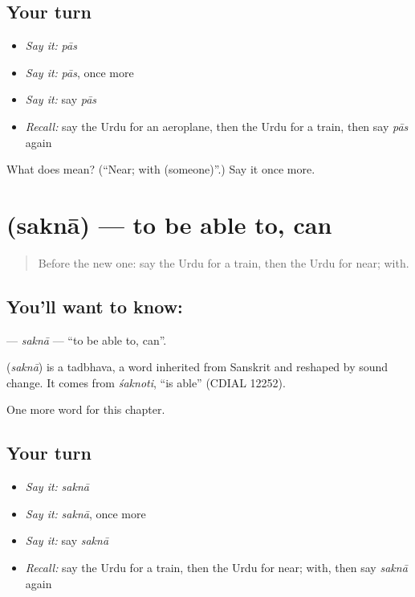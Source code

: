 \subsection*{Your turn}
\begin{itemize}
\raggedright
  \item \emph{Say it:} \emph{pās}
  \item \emph{Say it:} \emph{pās}, once more
  \item \emph{Say it:} say \emph{pās}
  \item \emph{Recall:} say the Urdu for an aeroplane, then the Urdu for a train, then say \emph{pās} again
\end{itemize}

\begin{tcolorbox}[breakable,colback=teal!4,colframe=teal!35!black,title={Before you move on}]
What does  mean? (\textquotedblleft{}Near; with (someone)\textquotedblright{}.) Say it once more.
\end{tcolorbox}
\section[\texorpdfstring{\ur{سکنا} (saknā)}{سکنا (saknā)}]{ (saknā) — to be able to, can}

\label{lesson:UR-C103-sakna}



\begin{quote}
Before the new one: say the Urdu for a train, then the Urdu for near; with.
\end{quote}

\subsection*{You'll want to know: }
\textbf{} — \emph{saknā} — \textquotedblleft{}to be able to, can\textquotedblright{}.

\begin{cousinweb}
\textbf{} (\emph{saknā}) is a tadbhava, a word inherited from Sanskrit and reshaped by sound change. It comes from \emph{śaknoti}, \textquotedblleft{}is able\textquotedblright{} (CDIAL 12252).
\end{cousinweb}

\begin{grammarlens}[title={What you've built}]
One more word for this chapter.
\end{grammarlens}

\subsection*{Your turn}
\begin{itemize}
\raggedright
  \item \emph{Say it:} \emph{saknā}
  \item \emph{Say it:} \emph{saknā}, once more
  \item \emph{Say it:} say \emph{saknā}
  \item \emph{Recall:} say the Urdu for a train, then the Urdu for near; with, then say \emph{saknā} again
\end{itemize}

